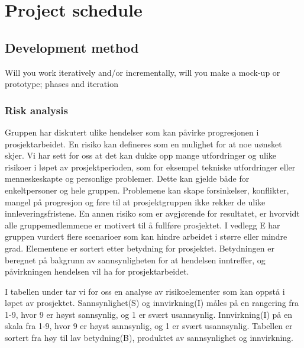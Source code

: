 \chapter{Project schedule}







\section{Development method}
Will you work iteratively and/or incrementally, will you make a 
mock-up or prototype; phases and iteration



\subsection{Risk analysis}
Gruppen har diskutert ulike hendelser som kan påvirke progresjonen i prosjektarbeidet. En risiko
kan defineres som en mulighet for at noe uønsket skjer. Vi har sett for oss at det kan dukke
opp mange utfordringer og ulike risikoer i løpet av prosjektperioden, som for eksempel tekniske
utfordringer eller menneskeskapte og personlige problemer. Dette kan gjelde både for enkeltpersoner
og hele gruppen. Problemene kan skape forsinkelser, konflikter, mangel på progresjon og føre til at
prosjektgruppen ikke rekker de ulike innleveringsfristene. En annen risiko som er avgjørende for
resultatet, er hvorvidt alle gruppemedlemmene er motivert til å fullføre prosjektet.
I vedlegg E har gruppen vurdert flere scenarioer som kan hindre arbeidet i større eller mindre
grad. Elementene er sortert etter betydning for prosjektet. Betydningen er beregnet på bakgrunn av
sannsynligheten for at hendelsen inntreffer, og påvirkningen hendelsen vil ha for prosjektarbeidet.

I tabellen under tar vi for oss en analyse av risikoelementer som kan oppstå i løpet av prosjektet.
Sannsynlighet(S) og innvirkning(I) måles på en rangering fra 1-9, hvor 9 er høyst sannsynlig,
og 1 er svært usannsynlig. Innvirkning(I) på en skala fra 1-9, hvor 9 er høyst sannsynlig, og 1 er
svært usannsynlig. Tabellen er sortert fra høy til lav betydning(B), produktet av sannsynlighet og
innvirkning.


